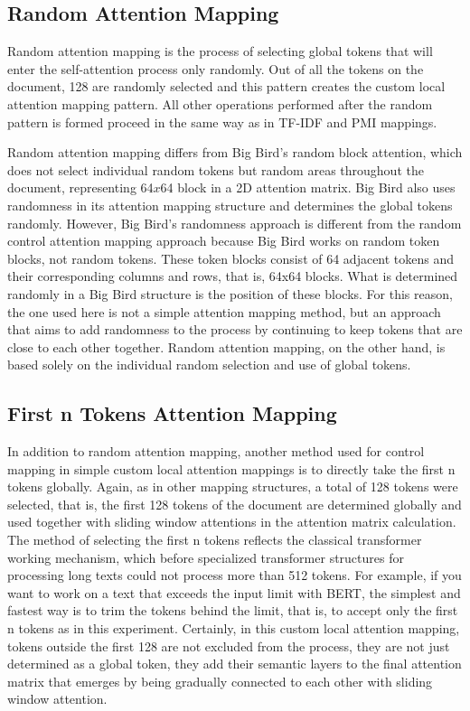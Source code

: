 \documentclass{iyte}
\begin{document}
\subsection{Random Attention Mapping}

Random attention mapping is the process of selecting global tokens that will enter the self-attention process only randomly. Out of all the tokens on the document, 128 are randomly selected and this pattern creates the custom local attention mapping pattern. All other operations performed after the random pattern is formed proceed in the same way as in TF-IDF and PMI mappings.

Random attention mapping differs from Big Bird's random block attention, which does not select individual random tokens but random areas throughout the document, representing 64$x$64 block in a 2D attention matrix. Big Bird also uses randomness in its attention mapping structure and determines the global tokens randomly. However, Big Bird's randomness approach is different from the random control attention mapping approach because Big Bird works on random token blocks, not random tokens. These token blocks consist of 64 adjacent tokens and their corresponding columns and rows, that is, 64x64 blocks. What is determined randomly in a Big Bird structure is the position of these blocks. For this reason, the one used here is not a simple attention mapping method, but an approach that aims to add randomness to the process by continuing to keep tokens that are close to each other together. Random attention mapping, on the other hand, is based solely on the individual random selection and use of global tokens.

\subsection{First n Tokens Attention Mapping}

In addition to random attention mapping, another method used for control mapping in simple custom local attention mappings is to directly take the first n tokens globally. Again, as in other mapping structures, a total of 128 tokens were selected, that is, the first 128 tokens of the document are determined globally and used together with sliding window attentions in the attention matrix calculation. The method of selecting the first n tokens reflects the classical transformer working mechanism, which before specialized transformer structures for processing long texts could not process more than 512 tokens. For example, if you want to work on a text that exceeds the input limit with BERT, the simplest and fastest way is to trim the tokens behind the limit, that is, to accept only the first n tokens as in this experiment. Certainly, in this custom local attention mapping, tokens outside the first 128 are not excluded from the process, they are not just determined as a global token, they add their semantic layers to the final attention matrix that emerges by being gradually connected to each other with sliding window attention.
\end{document}

